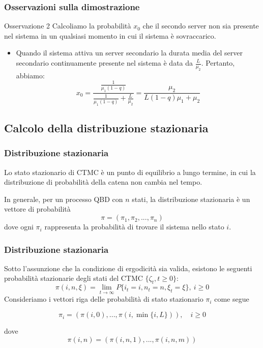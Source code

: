 \documentclass{beamer}
\begin{document}
\begin{frame}
    \frametitle{Osservazioni sulla dimostrazione}
    \begin{block}{Osservazione 2}
        Calcoliamo la probabilità $x_0$ che il secondo server non sia presente nel sistema in un qualsiasi momento in cui il sistema è sovraccarico.

        \begin{itemize}
            \item  Quando il sistema attiva un server secondario la durata media del server secondario continuamente presente nel sistema è data da $\frac{L}{\mu_2}$. Pertanto, abbiamo:
            \begin{equation*}
                x_0  = \frac{\frac{1}{\mu_1(1-q)}}{\frac{1}{\mu_1(1-q)} + \frac{L}{\mu_2}} = \frac{\mu_2}{L(1-q)\mu_1 + \mu_2}
            \end{equation*}
        \end{itemize}
    \end{block}
\end{frame}

\subsection{Calcolo della distribuzione stazionaria}

\begin{frame}
    \frametitle{Distribuzione stazionaria}
    \begin{block}{}
         \begin{center}
            Lo stato stazionario di CTMC è un punto di equilibrio a lungo termine, in cui la distribuzione di probabilità della catena non cambia nel tempo.
         \end{center}
    \end{block}
    In generale, per un processo QBD con $n$ stati, la distribuzione stazionaria è un vettore di probabilità
    $$\pi = (\pi_1, \pi_2, ..., \pi_n)$$
    dove ogni $\pi_i$ rappresenta la probabilità di trovare il sistema nello stato $i$.
\end{frame}


\begin{frame}
    \frametitle{Distribuzione stazionaria}
    Sotto l'assunzione che la condizione di ergodicità sia valida, esistono le seguenti probabilità stazionarie degli stati del CTMC $\{\zeta_t, t \geq 0\}$:
    $$\pi(i,n,\xi) = \lim_{t \to \infty} P\{i_t = i, n_t = n, \xi_t = \xi\}, ~ i \geq 0$$
    Consideriamo i vettori riga delle probabilità di stato stazionario $\pi_i$ come segue
    \begin{block}{}
        $$\pi_i = (\pi(i,0), ..., \pi(i, \min \{i,L\})), \quad i \geq 0$$
    \end{block}
    dove
    $$\pi(i,n) = (\pi(i,n,1), ..., \pi(i,n,m))$$
\end{frame}
\end{document}
